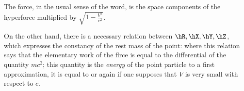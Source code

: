 The force, in the usual sense of the word, is the space components of the hyperforce multiplied by $\sqrt{1-\frac{V^2}{c^2}}$.

On the other hand, there is a necessary relation between $\hR, \hX, \hY, \hZ$, which expresses the constancy of the rest mass of the point:
where
this relation says that the elementary work of the flrce is equal to the differential of the quantity $mc^2$; this quantity is the \textit{energy} of the point particle
to a first approximation, it is equal to
or again
if one supposes that $V$ is very small with respect to $c$.
%
